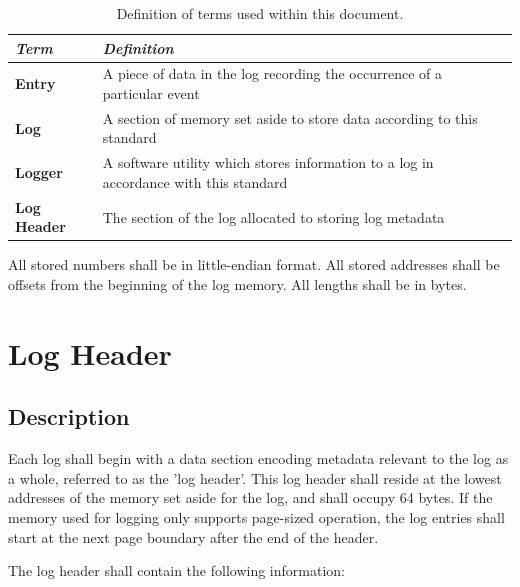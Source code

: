 \documentclass[paper=letter, fontsize=10pt]{scrartcl} %
\numberwithin{equation}{section} %
\numberwithin{figure}{section} %
\numberwithin{table}{section} %
\begin{document}
\begin{table}[ht!]
    \begin{center}
        \begin{tabularx}{\textwidth}{|l|X|}
            \hline
            \emph{Term}           & \emph{Definition}                                                                          \\ \hline
            \textbf{Entry}        & A piece of data in the log recording the occurrence of a particular event                  \\ \hline
            \textbf{Log}          & A section of memory set aside to store data according to this standard                \\ \hline
            \textbf{Logger}       & A software utility which stores information to a log in accordance with this standard \\ \hline
            \textbf{Log Header}   & The section of the log allocated to storing log metadata                                   \\ \hline
        \end{tabularx}
        \caption{Definition of terms used within this document.}
        \label{tab:terminology}
    \end{center}
\end{table}

All stored numbers shall be in little-endian format. All stored addresses shall
be offsets from the beginning of the log memory. All lengths shall be in bytes.

\section{Log Header} \label{sec:lh}

\subsection{Description} \label{sec:lh:desc}

Each log shall begin with a data section encoding metadata relevant to the log
as a whole, referred to as the 'log header'. This log header shall reside at the
lowest addresses of the memory set aside for the log, and shall occupy 64 bytes.
If the memory used for logging only supports page-sized operation, the log
entries shall start at the next page boundary after the end of the header.

The log header shall contain the following information:
\end{document}

